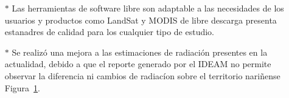 \begin{itemize}
  \item[$*$]Las herramientas de software libre son adaptable a las necesidades de los usuarios y productos como LandSat y MODIS de libre descarga presenta estanadres 
  de calidad para los cualquier tipo de estudio.

  \item[$*$]Se realizó una mejora a las estimaciones de radiación presentes en la actualidad, debido a que el reporte generado por el IDEAM no permite observar la 
  diferencia ni cambios de radiacíon sobre el territorio nariñense Figura~\ref{fig:ideamvsmodis}.
  \begin{figure}[htb]
    \centering{}
    \centering{}
    \label{fig:ideamvsmodis}
  \end{figure}


\end{itemize}
